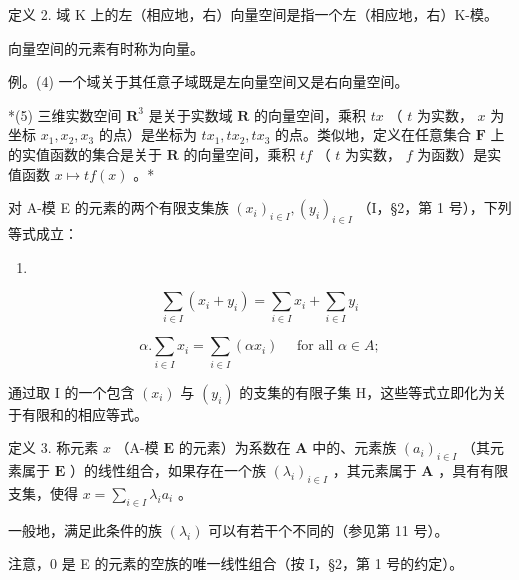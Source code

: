 定义 2. 域 K 上的左（相应地，右）向量空间是指一个左（相应地，右）K-模。

向量空间的元素有时称为向量。

例。(4) 一个域关于其任意子域既是左向量空间又是右向量空间。

*(5) 三维实数空间 \(\mathbf{R}^3\) 是关于实数域 \(\mathbf{R}\) 的向量空间，乘积 \(tx\) （ \(t\) 为实数， \(x\) 为坐标 \(x_1, x_2, x_3\) 的点）是坐标为 \(tx_1, tx_2, tx_3\) 的点。类似地，定义在任意集合 \(\mathbf{F}\) 上的实值函数的集合是关于 \(\mathbf{R}\) 的向量空间，乘积 \(tf\) （ \(t\) 为实数， \(f\) 为函数）是实值函数 \(x \mapsto tf(x)\) 。*

对 A-模 E 的元素的两个有限支集族 \((x_{i})_{i\in I}, (y_{i})_{i\in I}\) （I，§2，第 1 号），下列等式成立：

\begin{enumerate}
\def\labelenumi{(\arabic{enumi})}
\tightlist
\item
\end{enumerate}

\[
\sum_ {i \in I} (x _ {i} + y _ {i}) = \sum_ {i \in I} x _ {i} + \sum_ {i \in I} y _ {i}\tag{2}
\]

\[
\alpha . \sum_ {i \in I} x _ {i} = \sum_ {i \in I} (\alpha x _ {i}) \quad \text { for   all } \alpha \in A;
\]

通过取 I 的一个包含 \((x_{i})\) 与 \((y_{i})\) 的支集的有限子集 H，这些等式立即化为关于有限和的相应等式。

定义 3. 称元素 \(x\) （A-模 \(\mathbf{E}\) 的元素）为系数在 \(\mathbf{A}\) 中的、元素族 \((a_{i})_{i\in I}\) （其元素属于 \(\mathbf{E}\) ）的线性组合，如果存在一个族 \((\lambda_{i})_{i\in I}\) ，其元素属于 \(\mathbf{A}\) ，具有有限支集，使得 \(x = \sum_{i\in I}\lambda_{i}a_{i}\) 。

一般地，满足此条件的族 \((\lambda_{i})\) 可以有若干个不同的（参见第 11 号）。

注意，0 是 E 的元素的空族的唯一线性组合（按 I，§2，第 1 号的约定）。

